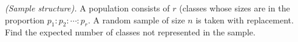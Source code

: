 \begin{problem}[Handout 6, \# 13]
  \emph{(Sample structure).} A population consists of \(r\) (classes whose
  sizes are in the proportion \(p_1:p_2:\dotsb:p_r\). A random sample of
  size \(n\) is taken with replacement. Find the expected number of classes
  not represented in the sample.
\end{problem}
\begin{solution}

\end{solution}

